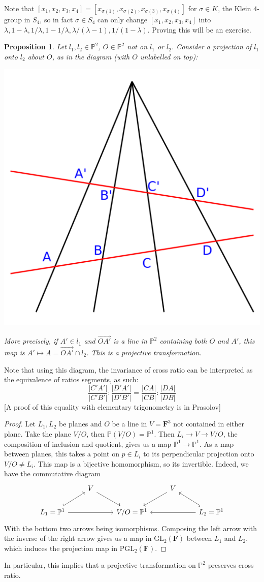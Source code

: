 \documentclass[12pt]{article}
\newcommand{\F}{\mathbf{F}}
\renewcommand{\P}{\mathbb{P}}
\newcommand{\GL}{\mathrm{GL}}
\renewcommand{\vec}{\overrightarrow}
\newcommand{\PGL}{\mathrm{PGL}}
\newtheorem{proposition}{Proposition}[section]
\begin{document}
    Note that $[x_1, x_2, x_3, x_4] = [x_{\sigma(1)}, x_{\sigma(2)}, x_{\sigma(3)}, x_{\sigma(4)}]$ for $\sigma \in K$, the Klein $4$-group in $S_4$, so in fact $\sigma \in S_4$ can only change $[x_1, x_2, x_3, x_4]$ into $\lambda, 1-\lambda, 1/\lambda, 1-1/\lambda, \lambda/(\lambda-1), 1/(1-\lambda)$. Proving this will be an exercise. \par
    \begin{proposition}
        Let $l_1, l_2 \in \P^2$, $O \in \P^2$ not on $l_1$ or $l_2$. Consider a projection of $l_1$ onto $l_2$ about $O$, as in the diagram (with $O$ unlabelled on top):
        \begin{center}
            \includegraphics[width = 0.4\linewidth]{crossratio.png}
        \end{center}
        More precisely, if $A' \in l_1$ and $\vec{OA'}$ is a line in $\P^2$ containing both $O$ and $A'$, this map is $A' \mapsto A = \vec{OA'} \cap l_2$. This is a projective transformation.
    \end{proposition}
    Note that using this diagram, the invariance of cross ratio can be interpreted as the equivalence of ratios segments, as such:
    $$\frac{|C'A'|}{|C'B'|}: \frac{|D'A'|}{|D'B'|} = \frac{|CA|}{|CB|}: \frac{|DA|}{|DB|}$$
    [A proof of this equality with elementary trigonometry is in Prasolov]
    \begin{proof}
        Let $L_1, L_2$ be planes and $O$ be a line in $V = \F^3$ not contained in either plane. Take the plane $V/O$, then $\P(V/O) = \P^1$. Then $L_i \to V \to V/O$, the composition of inclusion and quotient, gives us a map $\P^1 \to \P^1$. As a map between planes, this takes a point on $p \in L_i$ to its perpendicular projection onto $V/O \neq L_i$. This map is a bijective homomorphism, so its invertible. Indeed, we have the commutative diagram
        \[\begin{tikzcd}
            & V && V \\
            {L_1=\mathbb{P}^1} && {V/O=\mathbb{P}^1} && {L_2 = \mathbb{P}^1}
            \arrow[hook, from=2-1, to=1-2]
            \arrow[hook, from=2-5, to=1-4]
            \arrow[from=1-2, to=2-3]
            \arrow[from=1-4, to=2-3]
            \arrow[from=2-1, to=2-3]
            \arrow[from=2-5, to=2-3]
        \end{tikzcd}\]
        With the bottom two arrows being isomorphisms. Composing the left arrow with the inverse of the right arrow gives us a map in $\GL_2(\F)$ between $L_1$ and $L_2$, which induces the projection map in $\PGL_2(\F)$.
    \end{proof}
    In particular, this implies that a projective transformation on $\P^2$ preserves cross ratio.
\end{document}
